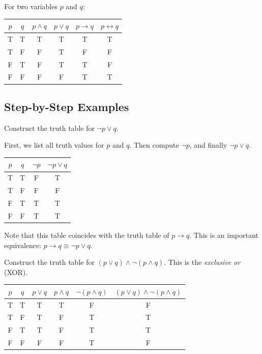 \documentclass[11pt,a4paper]{article}
\begin{document}
For two variables $p$ and $q$:

\begin{center}
\begin{tabular}{|c|c|c|c|c|c|}
\hline
$p$ & $q$ & $p \land q$ & $p \lor q$ & $p \to q$ & $p \leftrightarrow q$ \\
\hline
T & T & T & T & T & T \\
T & F & F & T & F & F \\
F & T & F & T & T & F \\
F & F & F & F & T & T \\
\hline
\end{tabular}
\end{center}

\subsection{Step-by-Step Examples}

\begin{example}
Construct the truth table for $\neg p \lor q$.

First, we list all truth values for $p$ and $q$. Then compute $\neg p$, and finally $\neg p \lor q$.
\begin{center}
\begin{tabular}{|c|c|c|c|}
\hline
$p$ & $q$ & $\neg p$ & $\neg p \lor q$ \\
\hline
T & T & F & T \\
T & F & F & F \\
F & T & T & T \\
F & F & T & T \\
\hline
\end{tabular}
\end{center}
Note that this table coincides with the truth table of $p \to q$. This is an important equivalence: $p \to q \equiv \neg p \lor q$.
\end{example}

\begin{example}
Construct the truth table for $(p \lor q) \land \neg (p \land q)$. This is the \textit{exclusive or} (XOR).
\begin{center}
\begin{tabular}{|c|c|c|c|c|c|}
\hline
$p$ & $q$ & $p \lor q$ & $p \land q$ & $\neg(p \land q)$ & $(p \lor q) \land \neg(p \land q)$ \\
\hline
T & T & T & T & F & F \\
T & F & T & F & T & T \\
F & T & T & F & T & T \\
F & F & F & F & T & F \\
\hline
\end{tabular}
\end{center}
\end{example}
\end{document}
